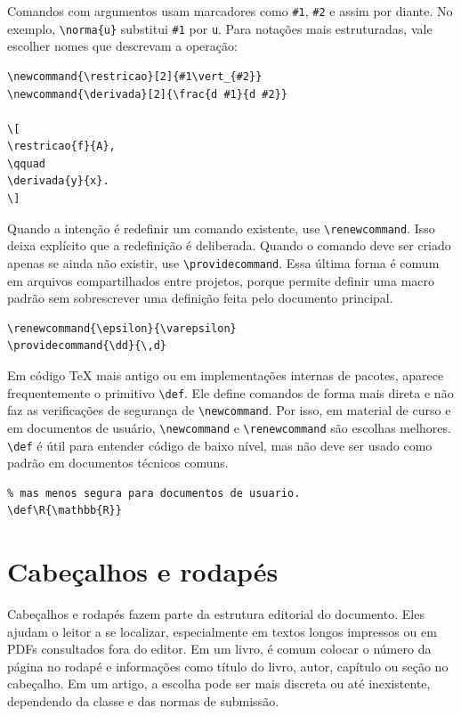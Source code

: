 Comandos com argumentos usam marcadores como \verb|#1|, \verb|#2| e assim por diante. No exemplo, \verb|\norma{u}| substitui \verb|#1| por \verb|u|. Para notações mais estruturadas, vale escolher nomes que descrevam a operação:

\begin{lstlisting}[language={[latex]TeX}, caption={Comandos com argumentos}]
\newcommand{\restricao}[2]{#1\vert_{#2}}
\newcommand{\derivada}[2]{\frac{d #1}{d #2}}

\[
\restricao{f}{A},
\qquad
\derivada{y}{x}.
\]
\end{lstlisting}

Quando a intenção é redefinir um comando existente, use \verb|\renewcommand|. Isso deixa explícito que a redefinição é deliberada. Quando o comando deve ser criado apenas se ainda não existir, use \verb|\providecommand|. Essa última forma é comum em arquivos compartilhados entre projetos, porque permite definir uma macro padrão sem sobrescrever uma definição feita pelo documento principal.

\begin{lstlisting}[language={[latex]TeX}, caption={Redefinição e definição condicional}]
\renewcommand{\epsilon}{\varepsilon}
\providecommand{\dd}{\,d}
\end{lstlisting}

Em código TeX mais antigo ou em implementações internas de pacotes, aparece frequentemente o primitivo \verb|\def|. Ele define comandos de forma mais direta e não faz as verificações de segurança de \verb|\newcommand|. Por isso, em material de curso e em documentos de usuário, \verb|\newcommand| e \verb|\renewcommand| são escolhas melhores. \verb|\def| é útil para entender código de baixo nível, mas não deve ser usado como padrão em documentos técnicos comuns.

\begin{lstlisting}[language={[latex]TeX}, caption={Definição primitiva em TeX}]
% Forma primitiva: comum em codigo de pacote,
% mas menos segura para documentos de usuario.
\def\R{\mathbb{R}}
\end{lstlisting}

\section{Cabeçalhos e rodapés}

Cabeçalhos e rodapés fazem parte da estrutura editorial do documento. Eles ajudam o leitor a se localizar, especialmente em textos longos impressos ou em PDFs consultados fora do editor. Em um livro, é comum colocar o número da página no rodapé e informações como título do livro, autor, capítulo ou seção no cabeçalho. Em um artigo, a escolha pode ser mais discreta ou até inexistente, dependendo da classe e das normas de submissão.

